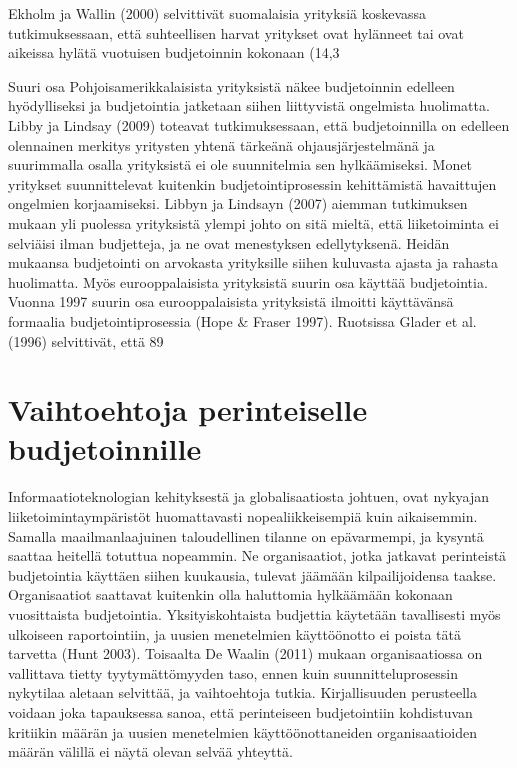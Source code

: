 \documentclass[12pt,a4paper,oneside,pdftex]{report}
\begin{document}
Ekholm ja Wallin (2000) selvittivät suomalaisia yrityksiä koskevassa tutkimuksessaan, että suhteellisen harvat yritykset ovat hylänneet tai ovat aikeissa hylätä vuotuisen budjetoinnin kokonaan (14,3 %

Suuri osa Pohjoisamerikkalaisista yrityksistä näkee budjetoinnin edelleen hyödylliseksi ja budjetointia jatketaan siihen liittyvistä ongelmista huolimatta. Libby ja Lindsay (2009) toteavat tutkimuksessaan, että budjetoinnilla on edelleen olennainen merkitys yritysten yhtenä tärkeänä ohjausjärjestelmänä ja suurimmalla osalla yrityksistä ei ole suunnitelmia sen hylkäämiseksi. Monet yritykset suunnittelevat kuitenkin budjetointiprosessin kehittämistä havaittujen ongelmien korjaamiseksi. Libbyn ja Lindsayn (2007) aiemman tutkimuksen mukaan yli puolessa yrityksistä ylempi johto on sitä mieltä, että liiketoiminta ei selviäisi ilman budjetteja, ja ne ovat menestyksen edellytyksenä. Heidän mukaansa budjetointi on arvokasta yrityksille siihen kuluvasta ajasta ja rahasta huolimatta. Myös eurooppalaisista yrityksistä suurin osa käyttää budjetointia. Vuonna 1997 suurin osa eurooppalaisista yrityksistä ilmoitti käyttävänsä formaalia budjetointiprosessia (Hope & Fraser 1997). Ruotsissa Glader et al. (1996) selvittivät, että 89 %

\chapter{Vaihtoehtoja perinteiselle budjetoinnille}
\label{chapter:vaihtoehtoja}

Informaatioteknologian kehityksestä ja globalisaatiosta johtuen, ovat nykyajan liiketoimintaympäristöt huomattavasti nopealiikkeisempiä kuin aikaisemmin. Samalla maailmanlaajuinen taloudellinen tilanne on epävarmempi, ja kysyntä saattaa heitellä totuttua nopeammin. Ne organisaatiot, jotka jatkavat perinteistä budjetointia käyttäen siihen kuukausia, tulevat jäämään kilpailijoidensa taakse. Organisaatiot saattavat kuitenkin olla haluttomia hylkäämään kokonaan vuosittaista budjetointia. Yksityiskohtaista budjettia käytetään tavallisesti myös ulkoiseen raportointiin, ja uusien menetelmien käyttöönotto ei poista tätä tarvetta (Hunt 2003). Toisaalta De Waalin (2011) mukaan organisaatiossa on vallittava tietty tyytymättömyyden taso, ennen kuin suunnitteluprosessin nykytilaa aletaan selvittää, ja vaihtoehtoja tutkia. Kirjallisuuden perusteella voidaan joka tapauksessa sanoa, että perinteiseen budjetointiin kohdistuvan kritiikin määrän ja uusien menetelmien käyttöönottaneiden organisaatioiden määrän välillä ei näytä olevan selvää yhteyttä.
\end{document}
